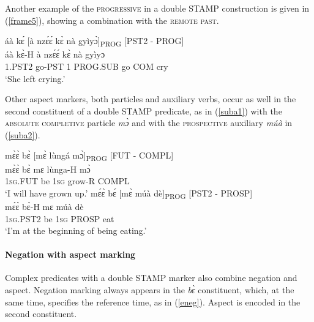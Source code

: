\noindent Another example of the \textsc{progressive} in a double STAMP construction is given in (\ref{frame5}), showing a combination with the \textsc{remote past}.

\begin{exe} 
\ex\label{frame5}
  \glll  áà kɛ́ [à nzɛ́ɛ́ kɛ̀ nà gyìyɔ̀]\textsubscript{PROG} \hfill [PST2 - PROG]   \\
          áà kɛ̀-H à nzɛ́ɛ́ kɛ̀ nà gyìyɔ \\
       1.PST2 go-PST 1 PROG.SUB go COM cry\\
    \trans `She left crying.'
\end{exe}

Other aspect markers, both particles and auxiliary verbs, occur as well in the second constituent of a double STAMP predicate, as in (\ref{suba1}) with the \textsc{absolute completive} particle {\itshape mɔ̀} and with the \textsc{prospective} auxiliary {\itshape múà} in (\ref{suba2}).

\begin{exe} 
\ex\label{suba}
\begin{xlist}
\ex\label{suba1}
  \glll    mɛ̀ɛ̀ bɛ̀ [mɛ̀ lùngá mɔ̀]\textsubscript{PROG} \hfill [FUT - COMPL]  \\
            mɛ̀ɛ̀ bɛ̀ mɛ lùnga-H mɔ̀ \\
             1\textsc{sg}.FUT be 1\textsc{sg} grow-R COMPL    \\
    \trans `I will have grown up.'
\ex\label{suba2}
  \glll   mɛ́ɛ̀ bɛ́ [mɛ̀ múà dè]\textsubscript{PROG} \hfill [PST2 - PROSP]\\
          mɛ́ɛ̀ bɛ̀-H mɛ múà dè \\
              1\textsc{sg}.PST2 be 1\textsc{sg} PROSP eat   \\
    \trans `I'm at the beginning of being eating.'
\end{xlist}
\end{exe}



\paragraph{Negation with aspect marking}
Complex predicates with a double STAMP marker also combine negation and aspect. Negation marking always appears in the {\itshape bɛ̀} constituent, which, at the same time,  specifies the reference time, as in (\ref{eneg}). Aspect is encoded in the second constituent.

